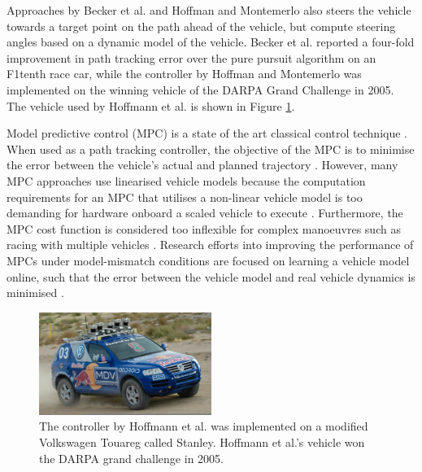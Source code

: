 Approaches by Becker et al. \cite{Becker2022} and Hoffman and Montemerlo \cite{Hoffmann2007} also steers the vehicle towards a target point on the path ahead of the vehicle, but compute steering angles based on a dynamic model of the vehicle.
Becker et al. \cite{Becker2022} reported a four-fold improvement in path tracking error over the pure pursuit algorithm on an F1tenth race car, while the controller by Hoffman and Montemerlo \cite{Hoffmann2007} was implemented on the winning vehicle of the DARPA Grand Challenge in 2005.
The vehicle used by Hoffmann et al.  \cite{Hoffmann2007} is shown in Figure \ref{fig:stanley}.

Model predictive control (MPC) is a state of the art classical control technique \cite{Tatulea-Codrean2020, Beal2013, Achin2021, Williams2016, Liniger2019, Brunner2018a}.
When used as a path tracking controller, the objective of the MPC is to minimise the error between the vehicle's actual and planned trajectory \cite{Liniger2019}.
However, many MPC approaches use linearised vehicle models \cite{Beal2013} because the computation requirements for an MPC that utilises a non-linear vehicle model is too demanding for hardware onboard a scaled vehicle to execute \cite{Tatulea-Codrean2020}.
Furthermore, the MPC cost function is considered too inflexible for complex manoeuvres such as racing with multiple vehicles \cite{Fuchs2021}.
Research efforts into improving the performance of MPCs under model-mismatch conditions are focused on learning a vehicle model online, such that the error between the vehicle model and real vehicle dynamics is minimised \cite{Tatulea-Codrean2020, Brunner2018a}.


\begin{figure}[htb!]
    \centering
    \includegraphics[width=0.5\textwidth]{contents/chapt2/figs/stanley.jpg}
    \caption[The Stanley vehicle]{The controller by Hoffmann et al. \cite{Hoffmann2007} was implemented on a modified Volkswagen Touareg called Stanley. Hoffmann et al.'s vehicle won the DARPA grand challenge in 2005.}
    \label{fig:stanley}
\end{figure}


